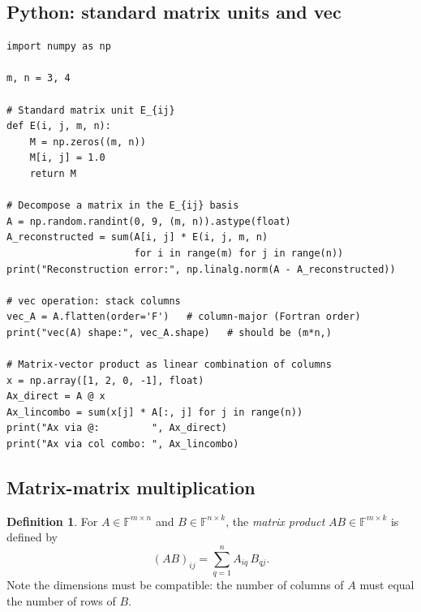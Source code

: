\documentclass[11pt]{article}
\theoremstyle{definition}
\newtheorem{definition}{Definition}[section]
\theoremstyle{plain}
\begin{document}
\subsection{Python: standard matrix units and vec}
\begin{lstlisting}
import numpy as np

m, n = 3, 4

# Standard matrix unit E_{ij}
def E(i, j, m, n):
    M = np.zeros((m, n))
    M[i, j] = 1.0
    return M

# Decompose a matrix in the E_{ij} basis
A = np.random.randint(0, 9, (m, n)).astype(float)
A_reconstructed = sum(A[i, j] * E(i, j, m, n)
                      for i in range(m) for j in range(n))
print("Reconstruction error:", np.linalg.norm(A - A_reconstructed))

# vec operation: stack columns
vec_A = A.flatten(order='F')   # column-major (Fortran order)
print("vec(A) shape:", vec_A.shape)   # should be (m*n,)

# Matrix-vector product as linear combination of columns
x = np.array([1, 2, 0, -1], float)
Ax_direct = A @ x
Ax_lincombo = sum(x[j] * A[:, j] for j in range(n))
print("Ax via @:         ", Ax_direct)
print("Ax via col combo: ", Ax_lincombo)
\end{lstlisting}

\subsection{Matrix-matrix multiplication}

\begin{definition}
  For $A\in\mathbb{F}^{m\times n}$ and $B\in\mathbb{F}^{n\times k}$, the
  \emph{matrix product} $AB\in\mathbb{F}^{m\times k}$ is defined by
  \[
    (AB)_{ij} = \sum_{q=1}^n A_{iq}\,B_{qj}.
  \]
  Note the dimensions must be compatible: the number of columns of $A$
  must equal the number of rows of $B$.
\end{definition}
\end{document}
